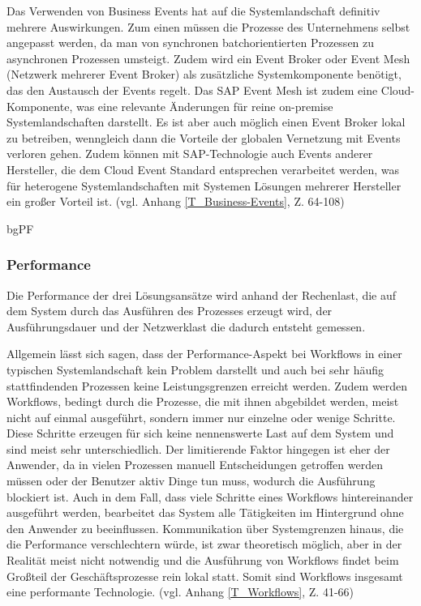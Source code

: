 Das Verwenden von Business Events hat auf die Systemlandschaft definitiv mehrere Auswirkungen. Zum einen müssen die Prozesse des Unternehmens selbst angepasst werden, da man von synchronen batchorientierten Prozessen zu asynchronen Prozessen umsteigt. Zudem wird ein Event Broker oder Event Mesh (Netzwerk mehrerer Event Broker) als zusätzliche Systemkomponente benötigt, das den Austausch der Events regelt. Das SAP Event Mesh ist zudem eine Cloud-Komponente, was eine relevante Änderungen für reine on-premise Systemlandschaften darstellt. Es ist aber auch möglich einen Event Broker lokal zu betreiben, wenngleich dann die Vorteile der globalen Vernetzung mit Events verloren gehen. Zudem können mit SAP-Technologie auch Events anderer Hersteller, die dem Cloud Event Standard entsprechen verarbeitet werden, was für heterogene Systemlandschaften mit Systemen Lösungen mehrerer Hersteller ein großer Vorteil ist. (vgl. Anhang \ref{T_Business-Events}, Z. 64-108)

bgPF

\subsubsection{Performance}

Die Performance der drei Lösungsansätze wird anhand der Rechenlast, die auf dem System durch das Ausführen des Prozesses erzeugt wird, der Ausführungsdauer und der Netzwerklast die dadurch entsteht gemessen.

Allgemein lässt sich sagen, dass der Performance-Aspekt bei Workflows in einer typischen Systemlandschaft kein Problem darstellt und auch bei sehr häufig stattfindenden Prozessen keine Leistungsgrenzen erreicht werden. Zudem werden Workflows, bedingt durch die Prozesse, die mit ihnen abgebildet werden, meist nicht auf einmal ausgeführt, sondern immer nur einzelne oder wenige Schritte. Diese Schritte erzeugen für sich keine nennenswerte Last auf dem System und sind meist sehr unterschiedlich. Der limitierende Faktor hingegen ist eher der Anwender, da in vielen Prozessen manuell Entscheidungen getroffen werden müssen oder der Benutzer aktiv Dinge tun muss, wodurch die Ausführung blockiert ist. Auch in dem Fall, dass viele Schritte eines Workflows hintereinander ausgeführt werden, bearbeitet das System alle Tätigkeiten im Hintergrund ohne den Anwender zu beeinflussen. Kommunikation über Systemgrenzen hinaus, die die Performance verschlechtern würde, ist zwar theoretisch möglich, aber in der Realität meist nicht notwendig und die Ausführung von Workflows findet beim Gro{\ss}teil der Geschäftsprozesse rein lokal statt. Somit sind Workflows insgesamt eine performante Technologie. (vgl. Anhang \ref{T_Workflows}, Z. 41-66)

